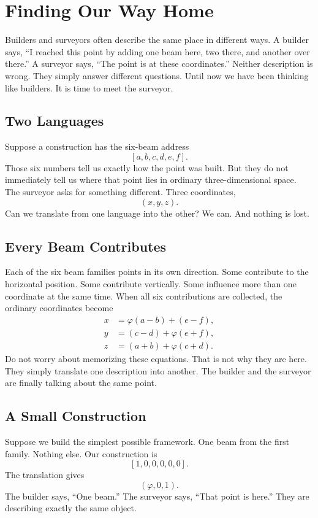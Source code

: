 \chapter{Finding Our Way Home}
\label{stone:home}

Builders and surveyors often describe the same place in different ways. A builder says, ``I reached this point by adding one beam here, two there, and another over there.'' A surveyor says, ``The point is at these coordinates.'' Neither description is wrong. They simply answer different questions. Until now we have been thinking like builders. It is time to meet the surveyor.

\section*{Two Languages}

Suppose a construction has the six-beam address
\[
[a,b,c,d,e,f].
\]
Those six numbers tell us exactly how the point was built. But they do not immediately tell us where that point lies in ordinary three-dimensional space. The surveyor asks for something different. Three coordinates,
\[
(x,y,z).
\]
Can we translate from one language into the other? We can. And nothing is lost.

\section*{Every Beam Contributes}

Each of the six beam families points in its own direction. Some contribute to the horizontal position. Some contribute vertically. Some influence more than one coordinate at the same time. When all six contributions are collected, the ordinary coordinates become
\[
\begin{aligned}
x &= \varphi(a-b)+(e-f),\\
y &= (c-d)+\varphi(e+f),\\
z &= (a+b)+\varphi(c+d).
\end{aligned}
\]
Do not worry about memorizing these equations. That is not why they are here. They simply translate one description into another. The builder and the surveyor are finally talking about the same point.

\section*{A Small Construction}

Suppose we build the simplest possible framework. One beam from the first family. Nothing else. Our construction is
\[
[1,0,0,0,0,0].
\]
The translation gives
\[
(\varphi,0,1).
\]
The builder says, ``One beam.'' The surveyor says, ``That point is here.'' They are describing exactly the same object.

